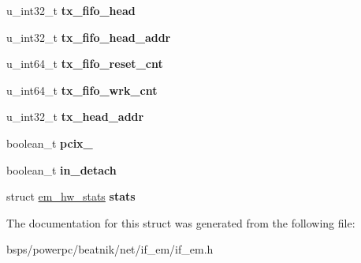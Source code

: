 \begin{DoxyCompactItemize}
\mbox{\label{structadapter_a302754a7ffaee2723887202846734891}} 
u\+\_\+int32\+\_\+t {\bfseries tx\+\_\+fifo\+\_\+head}
\item 
\mbox{\label{structadapter_a6f3c94c69115549fa5443026b4d01b4e}} 
u\+\_\+int32\+\_\+t {\bfseries tx\+\_\+fifo\+\_\+head\+\_\+addr}
\item 
\mbox{\label{structadapter_a855d72b63029b30489eccfd5fd55700d}} 
u\+\_\+int64\+\_\+t {\bfseries tx\+\_\+fifo\+\_\+reset\+\_\+cnt}
\item 
\mbox{\label{structadapter_a57f49b98c5a3efd623ea62d707f86728}} 
u\+\_\+int64\+\_\+t {\bfseries tx\+\_\+fifo\+\_\+wrk\+\_\+cnt}
\item 
\mbox{\label{structadapter_a2a04d8cc98f77a4dc086a975181720d6}} 
u\+\_\+int32\+\_\+t {\bfseries tx\+\_\+head\+\_\+addr}
\item 
\mbox{\label{structadapter_a6cdbaaa47b330e7312b3e4636f4e5d86}} 
boolean\+\_\+t {\bfseries pcix\+\_}
\item 
\mbox{\label{structadapter_ae417b650fc1a8fe7a81a014dc59775d2}} 
boolean\+\_\+t {\bfseries in\+\_\+detach}
\item 
\mbox{\label{structadapter_acb2caea0afc3007615b5c658f78244cb}} 
struct \mbox{\hyperlink{structem__hw__stats}{em\+\_\+hw\+\_\+stats}} {\bfseries stats}
\end{DoxyCompactItemize}


The documentation for this struct was generated from the following file\+:\begin{DoxyCompactItemize}
\item 
bsps/powerpc/beatnik/net/if\+\_\+em/if\+\_\+em.\+h\end{DoxyCompactItemize}
